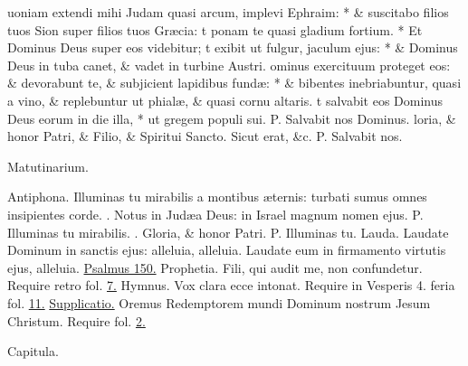 \documentclass[letter,11pt]{book}
\makeatletter
\DeclareRobustCommand{\Vbar}{\vers@resp{-0.1em}{V}}
\newcommand{\vers@resp@sym}{\raisebox{0.2ex}{\rotatebox[origin=c]{-20}{$\m@th\rceil$}}}
\newcommand{\vers@resp}[2]{%
  {\ooalign{\hidewidth\kern#1\vers@resp@sym\hidewidth\cr#2\cr}}%
}%
\def\P{\color{Red} P. \color{black}}
\def\V{\color{Red} \Vbar . \color{black}}
\makeatother
\begin{document}
\begin{multicols}{2}
uoniam extendi mihi Judam quasi arcum, implevi Ephraim: * \& suscitabo filios tuos Sion super filios tuos Gr\ae cia:
t ponam te quasi gladium fortium. * Et Dominus Deus super eos videbitur;
t exibit ut fulgur, jaculum ejus: * \& Dominus Deus in tuba canet, \& vadet in turbine Austri.
ominus exercituum proteget eos: \& devorabunt te, \& subjicient lapidibus fund\ae : * \& bibentes inebriabuntur, quasi a vino, \& replebuntur ut phial\ae , \& quasi cornu altaris.
t salvabit eos Dominus Deus eorum in die illa, * ut gregem populi sui. \P Salvabit nos Dominus. 
loria, \& honor Patri, \& Filio, \& Spiritui Sancto. Sicut erat, \&c.
\newline \P Salvabit nos.
\vspace{-.75em} \begin{center} \color{Red} Matutinarium. \end{center} \vspace{-.75em}
\par \noindent \color{Red} Antiphona. \color{black} Illuminas tu mirabilis a montibus \ae ternis: turbati sumus omnes insipientes corde. \V Notus in Jud\ae a Deus: in Israel magnum nomen ejus. \P Illuminas tu
mirabilis. \V Gloria, \& honor Patri. \P Illuminas tu.
\newline \color{Red} Lauda. \color{black} Laudate Dominum in sanctis ejus: alleluia, alleluia. Laudate eum in firmamento virtutis ejus, alleluia.
\newline \color{Red} \hyperlink{ps150}{Psalmus 150.} Prophetia. \color{black} Fili, qui audit me, non confundetur. \color{Red} Require retro fol. \color{black} \hyperlink{sirach.24}{7.}
\newline \color{Red} Hymnus. \color{black} Vox clara ecce intonat. \color{Red} Require in Vesperis 4. feria fol. \color{black} \hyperlink{WED-PRIMA-ADV-VES}{11.} \color{Red} \hyperlink{Supplicatio}{Supplicatio.} \color{black} Oremus Redemptorem mundi Dominum nostrum Jesum Christum. \color{Red} Require fol. \hyperlink{Supplicatio}{2.} \color{black}
\vspace{-.75em} \begin{center} \color{Red} Capitula. \end{center} \vspace{-.75em}

\end{multicols}
\end{document}
